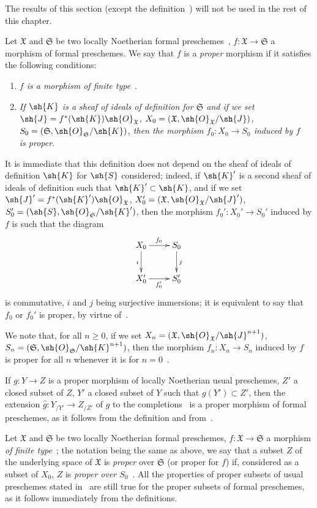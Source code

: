 The results of this section (except the definition~) will not be used in the rest of this chapter.

\begin{env}[3.4.1]
\label{III.3.4.1}
Let $\mathfrak{X}$ and $\mathfrak{S}$ be two locally Noetherian formal preschemes~, $f:\mathfrak{X}\to\mathfrak{S}$ a morphism of formal preschemes.
We say that $f$ is a \emph{proper} morphism if it satisfies the following conditions:
\begin{enumerate}
  \item[1st.] \emph{$f$ is a morphism of finite type~}.
  \item[2nd.] \emph{If $\sh{K}$ is a sheaf of ideals of definition for $\mathfrak{S}$ and if we set $\sh{J}=f^*(\sh{K})\sh{O}_\mathfrak{X}$, $X_0=(\mathfrak{X},\sh{O}_\mathfrak{X}/\sh{J})$, $S_0=(\mathfrak{S},\sh{O}_\mathfrak{S}/\sh{K})$, then the morphism $f_0:X_0\to S_0$ induced by $f$~ is proper}.
\end{enumerate}
It is immediate that this definition does not depend on the sheaf of ideals of definition $\sh{K}$ for $\sh{S}$ considered; indeed, if $\sh{K}'$ is a second sheaf of ideals of definition such that $\sh{K}'\subset\sh{K}$, and if we set $\sh{J}'=f^*(\sh{K}')\sh{O}_\mathfrak{X}$, $X_0'=(\mathfrak{X},\sh{O}_\mathfrak{X}/\sh{J}')$, $S_0'=(\sh{S},\sh{O}_\mathfrak{S}/\sh{K}')$, then the morphism $f_0':X_0'\to S_0'$ induced by $f$ is such that the diagram
\[
  \xymatrix{
    X_0\ar[r]^{f_0}\ar[d]_i &
    S_0\ar[d]^j\\
    X_0'\ar[r]_{f_0'} &
    S_0'
  }
\]
is commutative, $i$ and $j$ being surjective immersions; it is equivalent to say that $f_0$ or $f_0'$ is proper, by virtue of~.

We note that, for all $n\geq 0$, if we set $X_n=(\mathfrak{X},\sh{O}_\mathfrak{X}/\sh{J}^{n+1})$, $S_n=(\mathfrak{S},\sh{O}_\mathfrak{S}/\sh{K}^{n+1})$, then the morphism $f_n:X_n\to S_n$ induced by $f$~ is proper for all $n$ whenever it is for $n=0$~.

If $g:Y\to Z$ is a proper morphism of locally Noetherian usual preschemes, $Z'$ a closed subset of $Z$, $Y'$ a closed subset of $Y$ such that $g(Y')\subset Z'$, then the extension $\widehat{g}:Y_{/Y'}\to Z_{/Z'}$ of $g$ to the completions~ is a proper morphism of formal preschemes, as it follows from the definition and from~.

Let $\mathfrak{X}$ and $\mathfrak{S}$ be two locally Noetherian formal preschemes, $f:\mathfrak{X}\to\mathfrak{S}$ a morphism \emph{of finite type}~; the notation being the same as above, we say that a subset $Z$ of the underlying space of $\mathfrak{X}$ is \emph{proper} over $\mathfrak{S}$ (or proper for $f$) if, considered as a subset of $X_0$, $Z$ is \emph{proper over $S_0$}~.
All the properties of proper subsets of usual preschemes stated in~ are still true for the proper subsets of formal preschemes, as it follows immediately from the definitions.
\end{env}

